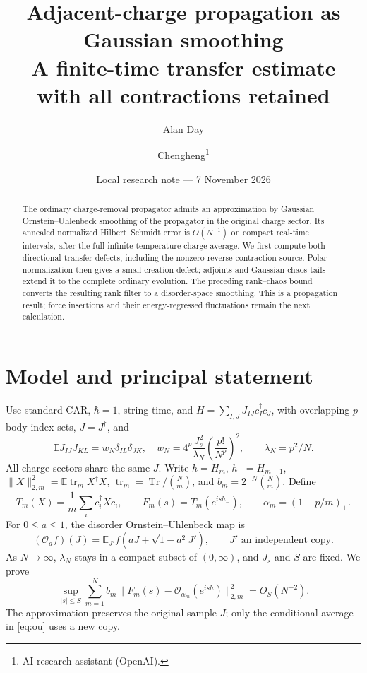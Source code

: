 \documentclass[11pt,a4paper]{article}
\title{Adjacent-charge propagation as Gaussian smoothing\\A finite-time transfer estimate with all contractions retained}
\author{Alan Day \and Chengheng\thanks{AI research assistant (OpenAI).}}
\date{Local research note --- 7 November 2026}
\newcommand{\EE}{\mathbb E}
\newcommand{\tr}{\operatorname{tr}}
\begin{document}
\maketitle
\begin{abstract}
The ordinary charge-removal propagator admits an approximation by
Gaussian Ornstein--Uhlenbeck smoothing of the propagator in the original
charge sector. Its annealed normalized Hilbert--Schmidt error is
$O(N^{-1})$ on compact real-time intervals, after the full infinite-temperature
charge average. We first compute both directional transfer defects,
including the nonzero reverse contraction source. Polar normalization
then gives a small creation defect; adjoints and Gaussian-chaos tails
extend it to the complete ordinary evolution. The preceding rank--chaos
bound converts the resulting rank filter to a disorder-space smoothing.
This is a propagation result; force insertions and their energy-regressed
fluctuations remain the next calculation.
\end{abstract}

\section{Model and principal statement}
Use standard CAR, $\hbar=1$, string time, and
$H=\sum_{I,J}J_{IJ}c_I^\dagger c_J$, with overlapping $p$-body index sets,
$J=J^\dagger$, and
\begin{equation}
 \EE J_{IJ}J_{KL}=w_N\delta_{IL}\delta_{JK},\quad
 w_N=4^p\frac{J_s^2}{\lambda_N}\left(\frac{p!}{N^p}\right)^2,
 \qquad \lambda_N=p^2/N.
\end{equation}
All charge sectors share the same $J$. Write $h=H_m$, $h_-=H_{m-1}$,
$\|X\|_{2,m}^2=\EE\tr_mX^\dagger X$, $\tr_m=\operatorname{Tr}/\binom Nm$,
and $b_m=2^{-N}\binom Nm$. Define
\begin{equation}
 T_m(X)=\frac1m\sum_i c_i^\dagger Xc_i,\qquad
 F_m(s)=T_m(e^{ish_-}),\qquad \alpha_m=(1-p/m)_+.
\end{equation}
For $0\le a\le1$, the disorder Ornstein--Uhlenbeck map is
\begin{equation}
 (\mathcal O_a f)(J)=\EE_{J'}f(aJ+\sqrt{1-a^2}J'),
 \qquad J'\text{ an independent copy}.
 \label{eq:ou}
\end{equation}
As $N\to\infty$, $\lambda_N$ stays in a compact subset of $(0,\infty)$,
and $J_s$ and $S$ are fixed. We prove
\begin{equation}
 \boxed{\quad
 \sup_{|s|\le S}\sum_{m=1}^N b_m
 \|F_m(s)-\mathcal O_{\alpha_m}(e^{ish})\|_{2,m}^2
 =O_S(N^{-2}).\quad}
 \label{eq:main}
\end{equation}
The approximation preserves the original sample $J$; only the
conditional average in \eqref{eq:ou} uses a new copy.
\end{document}
